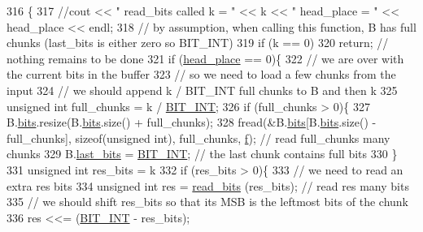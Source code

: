 \begin{DoxyCode}
316                                                    \{
317   \textcolor{comment}{//cout << " read\_bits called k = " << k << " head\_place = " << head\_place << endl;}
318   \textcolor{comment}{// by assumption, when calling this function, B has full chunks (last\_bits is either zero so BIT\_INT)}
319   \textcolor{keywordflow}{if} (k == 0)
320     \textcolor{keywordflow}{return}; \textcolor{comment}{// nothing remains to be done}
321   \textcolor{keywordflow}{if} (\hyperlink{classibitstream_a7b96359ac1534a5565e6e9b0cc53a0b3}{head\_place} == 0)\{
322     \textcolor{comment}{// we are over with the current bits in the buffer}
323     \textcolor{comment}{// so we need to load a few chunks from the input}
324     \textcolor{comment}{// we should append k / BIT\_INT full chunks to B and then k %
325     \textcolor{keywordtype}{unsigned} \textcolor{keywordtype}{int} full\_chunks = k / \hyperlink{bitstream_8h_afcadf5aa65c5159bfb96c4d82ebc0a5d}{BIT\_INT};
326     \textcolor{keywordflow}{if} (full\_chunks > 0)\{
327       B.\hyperlink{classbit__pipe_a86f38af1e9736b053728033490476b50}{bits}.resize(B.\hyperlink{classbit__pipe_a86f38af1e9736b053728033490476b50}{bits}.size() + full\_chunks);
328       fread(&B.\hyperlink{classbit__pipe_a86f38af1e9736b053728033490476b50}{bits}[B.\hyperlink{classbit__pipe_a86f38af1e9736b053728033490476b50}{bits}.size() - full\_chunks], \textcolor{keyword}{sizeof}(\textcolor{keywordtype}{unsigned} int), full\_chunks, 
      \hyperlink{classibitstream_a3ea2cdd0cf97820f0e1520c42e364308}{f}); \textcolor{comment}{// read full\_chunks many chunks}
329       B.\hyperlink{classbit__pipe_a0f3e84b02751803adaab499b5dad86fe}{last\_bits} = \hyperlink{bitstream_8h_afcadf5aa65c5159bfb96c4d82ebc0a5d}{BIT\_INT}; \textcolor{comment}{// the last chunk contains full bits }
330     \}
331     \textcolor{keywordtype}{unsigned} \textcolor{keywordtype}{int} res\_bits = k %
332     \textcolor{keywordflow}{if} (res\_bits > 0)\{
333       \textcolor{comment}{// we need to read an extra res bits}
334       \textcolor{keywordtype}{unsigned} \textcolor{keywordtype}{int} res = \hyperlink{classibitstream_a2fdcaecf10fefa6942dcd5286a2696e0}{read\_bits} (res\_bits); \textcolor{comment}{// read res many bits}
335       \textcolor{comment}{// we should shift res\_bits so that its MSB is the leftmost bits of the chunk}
336       res <<= (\hyperlink{bitstream_8h_afcadf5aa65c5159bfb96c4d82ebc0a5d}{BIT\_INT} - res\_bits);
}
\end{DoxyCode}
